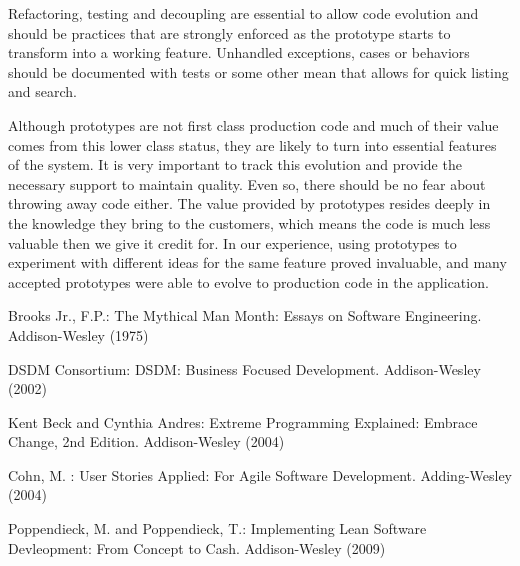 \documentclass[lnbip]{svmultln}
\begin{document}
Refactoring, testing and decoupling are essential to allow code
evolution and should be practices that are strongly enforced as the
prototype starts to transform into a working feature.  Unhandled
exceptions, cases or behaviors should be documented with tests or some
other mean that allows for quick listing and search.

Although prototypes are not first class production code and much of
their value comes from this lower class status, they are likely to
turn into essential features of the system. It is very important to
track this evolution and provide the necessary support to maintain
quality. Even so, there should be no fear about throwing away code
either.  The value provided by prototypes resides deeply in the
knowledge they bring to the customers, which means the code is much
less valuable then we give it credit for. In our experience, using
prototypes to experiment with different ideas for the same feature
proved invaluable, and many accepted prototypes were able to evolve to
production code in the application.

%
%
\begin{thebibliography}{5}

 Brooks Jr., F.P.: The Mythical Man Month: Essays
  on Software Engineering. Addison-Wesley (1975)

 DSDM Consortium: DSDM: Business Focused
  Development. Addison-Wesley (2002)
  
 Kent Beck and Cynthia Andres: Extreme Programming
  Explained: Embrace Change, 2nd Edition. Addison-Wesley (2004)




 Cohn, M. : User Stories Applied: For Agile Software
  Development. Adding-Wesley (2004)

 Poppendieck, M. and Poppendieck, T.:
  Implementing Lean Software Devleopment: From Concept to
  Cash. Addison-Wesley (2009)

\end{thebibliography}
%
\end{document}

